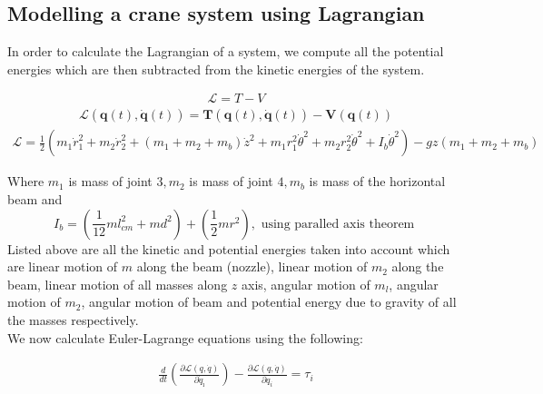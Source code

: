 \documentclass{UoNMCHA}
\numberwithin{equation}{section}
\begin{document}
	
	\subsection{Modelling a crane system using Lagrangian}
	
	In order to calculate the Lagrangian of a system, we compute all the potential energies which are then
	subtracted from the kinetic energies of the system.
	
	\begin{align}
	\mathcal{L}=T-V
		\end{align}
		\begin{align}
		\mathcal{L}(\boldsymbol{q}(t), \dot{\boldsymbol{q}}(t))=\boldsymbol{T}(\boldsymbol{q}(t), \dot{\boldsymbol{q}}(t))-\boldsymbol{V}(\boldsymbol{q}(t))
	\end{align}
	\begin{align}
		\mathcal{L}=\frac{1}{2}\left(m_{1} \dot{r}_{1}^{2}+m_{2} \dot{r}_{2}^{2}+\left(m_{1}+m_{2}+m_{b}\right) \dot{z}^{2}+m_{1} r_{1}^{2} \dot{\theta}^{2}+m_{2} r_{2}^{2} \dot{\theta}^{2}+I_{b} \dot{\theta}^{2}\right)-g z\left(m_{1}+m_{2}+m_{b}\right)
	\end{align}

	Where $m_{1}$ is mass of joint $3, m_{2}$ is mass of joint $4, m_{b}$ is mass of the horizontal beam and
	$$
	I_{b}=\left(\frac{1}{12} m l_{c m}^{2}+m d^{2}\right)+\left(\frac{1}{2} m r^{2}\right), \text { using paralled axis theorem }
	$$
	Listed above are all the kinetic and potential energies taken into account which are linear motion of $m$
	along the beam (nozzle), linear motion of $m_{2}$ along the beam, linear motion of all masses along $z$ axis,
	angular motion of $m_{l}$, angular motion of $m_{2}$, angular motion of beam and potential energy due to
	gravity of all the masses respectively. \\
	We now calculate Euler-Lagrange equations using the following:

	\begin{align}
		\frac{d}{d t}\left(\frac{\partial \mathcal{L}(q, \dot{q})}{\partial 	\dot{q}_{\imath}}\right)-\frac{\partial \mathcal{L}(q, \dot{q})}{\partial q_{i}}=\tau_{i}
	\end{align}
\end{document}
